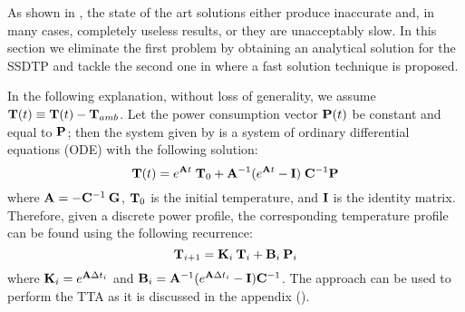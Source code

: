 As shown in , the state of the art solutions either produce inaccurate and, in many cases, completely useless results, or they are unacceptably slow. In this section we eliminate the first problem by obtaining an analytical solution for the SSDTP and tackle the second one in  where a fast solution technique is proposed.

In the following explanation, without loss of generality, we assume $\mathbf{T}(t) \equiv \mathbf{T}(t) - \mathbf{T}_{amb}$. Let the power consumption vector $\mathbf{P}(t)$ be constant and equal to $\mathbf{P}$; then the system given by  is a system of ordinary differential equations (ODE) with the following solution:
\begin{equation} \label{eq:solution}
  \mathbf{T}(t) = e^{\mathbf{A} t} \; \mathbf{T}_0 + \mathbf{A}^{-1} (e^{\mathbf{A} t} - \mathbf{I}) \; \mathbf{C}^{-1} \mathbf{P}
\end{equation}
where $\mathbf{A} = -\mathbf{C}^{-1} \: \mathbf{G}$, $\mathbf{T}_0$ is the initial temperature, and $\mathbf{I}$ is the identity matrix. Therefore, given a discrete power profile, the corresponding temperature profile can be found using the following recurrence:
\begin{equation} \label{eq:recurrent-system}
  \mathbf{T}_{i+1} = \mathbf{K}_i \: \mathbf{T}_i + \mathbf{B}_i \: \mathbf{P}_i
\end{equation}
where $\mathbf{K}_i = e^{\mathbf{A} \Delta t_i}$ and $\mathbf{B}_i = \mathbf{A}^{-1}(e^{\mathbf{A} \Delta t_i} - \mathbf{I})\mathbf{C}^{-1}$. The approach can be used to perform the TTA as it is discussed in the appendix ().

